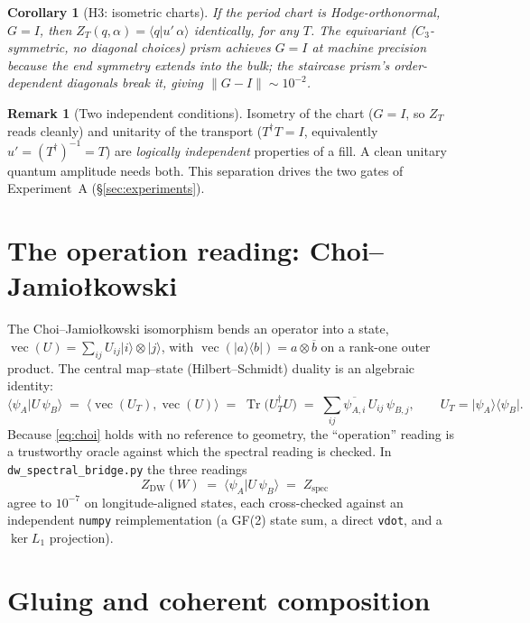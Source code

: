 \documentclass[11pt]{article}
\DeclareMathOperator{\Tr}{Tr}
\DeclareMathOperator{\vecop}{vec}
\newcommand{\ket}[1]{\lvert #1 \rangle}
\newcommand{\bra}[1]{\langle #1 \rvert}
\newcommand{\braket}[2]{\langle #1 \vert #2 \rangle}
\newcommand{\inner}[2]{\langle #1, #2 \rangle}
\newcommand{\norm}[1]{\lVert #1 \rVert}
\newcommand{\ZT}{Z_{T}}
\newcommand{\Zdw}{Z_{\mathrm{DW}}}
\newcommand{\Zsp}{Z_{\mathrm{spec}}}
\newcommand{\code}[1]{\texttt{#1}}
\theoremstyle{plain}
\newtheorem{corollary}[theorem]{Corollary}
\theoremstyle{definition}
\newtheorem{remark}[theorem]{Remark}
\begin{document}
\begin{corollary}[H3: isometric charts]
\label{cor:H3}
If the period chart is Hodge-orthonormal, $G=I$, then $\ZT(q,\alpha)=\braket{q}{u'\,\alpha}$
\emph{identically, for any $T$}. The equivariant ($C_3$-symmetric, no diagonal choices)
prism achieves $G=I$ at machine precision because the end symmetry extends into the bulk;
the staircase prism's order-dependent diagonals break it, giving $\norm{G-I}\sim 10^{-2}$.
\end{corollary}

\begin{remark}[Two independent conditions]
Isometry of the chart ($G=I$, so $\ZT$ reads cleanly) and unitarity of the transport
($T^\dagger T=I$, equivalently $u'=(T^\dagger)^{-1}=T$) are \emph{logically independent}
properties of a fill. A clean unitary quantum amplitude needs both. This separation drives
the two gates of Experiment~A (\S\ref{sec:experiments}).
\end{remark}

\section{The operation reading: Choi--Jamio\l{}kowski}
\label{sec:choi}

The Choi--Jamio\l{}kowski isomorphism bends an operator into a state,
$\vecop(U)=\sum_{ij}U_{ij}\ket{i}\otimes\ket{j}$, with
$\vecop(\ket a\bra b)=a\otimes\overline{b}$ on a rank-one outer product. The central
map--state (Hilbert--Schmidt) duality is an algebraic identity:
\begin{equation}
  \braket{\psi_A}{U\,\psi_B}
    \;=\; \inner{\vecop(U_T)}{\vecop(U)}
    \;=\; \Tr\!\big(U_T^\dagger U\big)
    \;=\; \sum_{ij}\overline{\psi_{A,i}}\,U_{ij}\,\psi_{B,j},
  \qquad U_T=\ket{\psi_A}\bra{\psi_B}.
  \label{eq:choi}
\end{equation}
Because \eqref{eq:choi} holds with no reference to geometry, the ``operation'' reading is a
trustworthy oracle against which the spectral reading is checked. In
\code{dw\_spectral\_bridge.py} the three readings
\begin{equation}
  \Zdw(W)\;=\;\braket{\psi_A}{U\,\psi_B}\;=\;\Zsp
\end{equation}
agree to $10^{-7}$ on longitude-aligned states, each cross-checked against an independent
\code{numpy} reimplementation (a GF(2) state sum, a direct \code{vdot}, and a $\ker L_1$
projection).

\section{Gluing and coherent composition}
\label{sec:gluing}
\end{document}
